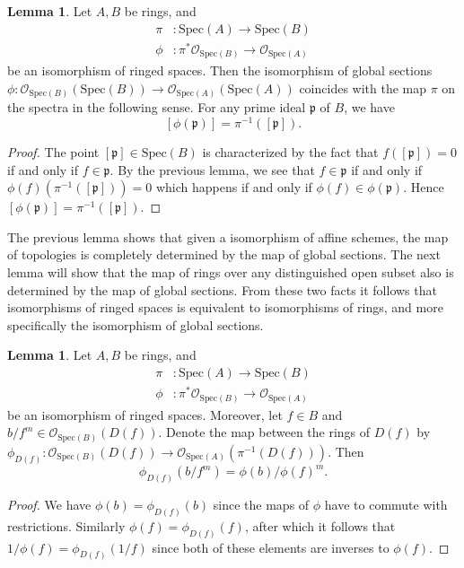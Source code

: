 \documentclass{article}
\theoremstyle{definition}
\newtheorem{lemma}[theorem]{Lemma}
\newcommand{\oo}{\mathcal{O}}
\newcommand{\osp}[1]{\oo_{\Spec\left(#1\right)}}
\newcommand{\Spec}{\text{Spec}}
\begin{document}
\begin{lemma}
	Let $A, B$ be rings, and 
	\begin{align*}
		\pi &: \Spec(A) \to \Spec(B) \\
		\phi &: \pi^*\osp{B} \to \osp{A}
	\end{align*}
	be an isomorphism of ringed spaces. Then the isomorphism of global sections
	$\phi : \osp{B}(\Spec(B)) \to \osp{A}(\Spec(A))$ coincides with the map
	$\pi$ on the spectra in the following sense. For any prime ideal
	$\mathfrak{p}$ of $B$, we have
	\[
		[\phi(\mathfrak{p})]
		=
		\pi^{-1}([\mathfrak{p}]).
	\] 
\end{lemma}
\begin{proof}
	The point $[\mathfrak{p}] \in \Spec(B)$ is characterized by the fact that
	$f([\mathfrak{p}]) = 0$ if and only if $f \in \mathfrak{p}$. By the
	previous lemma, we see that $f \in \mathfrak{p}$ if and only if
	$\phi(f)(\pi^{-1}([\mathfrak{p}])) = 0$ which happens if and only if
	$\phi(f) \in \phi(\mathfrak{p})$. Hence $[\phi(\mathfrak{p})] =
	\pi^{-1}([\mathfrak{p}])$.
\end{proof}

The previous lemma shows that given a isomorphism of affine schemes, the map of
topologies is completely determined by the map of global sections. The next
lemma will show that the map of rings over any distinguished open subset also
is determined by the map of global sections. From these two facts it follows
that isomorphisms of ringed spaces is equivalent to isomorphisms of rings, and
more specifically the isomorphism of global sections.

\begin{lemma}
	Let $A, B$ be rings, and 
	\begin{align*}
		\pi &: \Spec(A) \to \Spec(B) \\
		\phi &: \pi^*\osp{B} \to \osp{A}
	\end{align*}
	be an isomorphism of ringed spaces. Moreover, let $f \in B$ and $b/f^m \in
	\osp{B}(D(f))$. Denote the map between the rings of $D(f)$ by $\phi_{D(f)}
	: \osp{B}(D(f)) \to \osp{A}(\pi^{-1}(D(f)))$. Then
	\[
		\phi_{D(f)}(b/f^m)
		=
		\phi(b)/\phi(f)^m.
	\] 
\end{lemma}
\begin{proof}
	We have $\phi(b) = \phi_{D(f)}(b)$ since the maps of $\phi$ have to commute
	with restrictions. Similarly $\phi(f) = \phi_{D(f)}(f)$, after which it
	follows that $1/\phi(f) = \phi_{D(f)}(1/f)$ since both of these elements
	are inverses to $\phi(f)$.
\end{proof}
\end{document}
